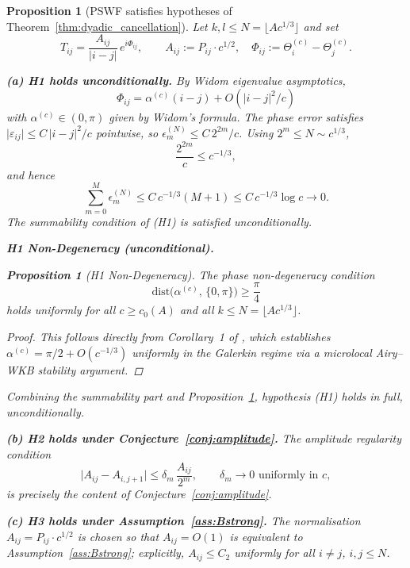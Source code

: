 \documentclass[12pt]{amsart}
\newtheorem{proposition}[theorem]{Proposition}
\theoremstyle{definition}
\theoremstyle{remark}
\newcommand{\abs}[1]{\lvert#1\rvert}
\begin{document}
\begin{proposition}[PSWF satisfies hypotheses of
  Theorem~\ref{thm:dyadic_cancellation}]
\label{prop:PSWF_hypotheses}
Let $k,l \leq N = \lfloor Ac^{1/3} \rfloor$ and set
\[
  T_{ij} = \frac{A_{ij}}{\abs{i-j}}\,e^{i\Phi_{ij}},
  \qquad
  A_{ij} := P_{ij} \cdot c^{1/2},
  \quad
  \Phi_{ij} := \Theta_i^{(c)} - \Theta_j^{(c)}.
\]

\medskip\noindent
\textbf{(a) H1 holds unconditionally.}
By Widom eigenvalue asymptotics,
\[
  \Phi_{ij} = \alpha^{(c)}(i-j) + O(\abs{i-j}^2/c)
\]
with $\alpha^{(c)} \in (0,\pi)$ given by Widom's formula.
The phase error satisfies $\abs{\varepsilon_{ij}}
\leq C\,\abs{i-j}^2/c$ pointwise, so
$\epsilon_m^{(N)} \leq C\,2^{2m}/c$.
Using $2^m \leq N \sim c^{1/3}$,
\[
  \frac{2^{2m}}{c} \leq c^{-1/3},
\]
and hence
\[
  \sum_{m=0}^{M} \epsilon_m^{(N)}
  \leq C\,c^{-1/3}(M+1)
  \leq C\,c^{-1/3}\log c \to 0.
\]
The summability condition of \textup{(H1)} is satisfied
unconditionally.

\medskip\noindent
\textbf{H1 Non-Degeneracy (unconditional).}

\begin{proposition}[H1 Non-Degeneracy]
\label{prop:H1_nondeg}
The phase non-degeneracy condition
\[
  \mathrm{dist}\bigl(\alpha^{(c)},\,\{0,\pi\}\bigr)
  \ge \frac{\pi}{4}
\]
holds uniformly for all $c \ge c_0(A)$
and all $k \le N = \lfloor Ac^{1/3}\rfloor$.
\end{proposition}

\begin{proof}
This follows directly from Corollary~1 of \cite{PhaseNondeg},
which establishes
$\alpha^{(c)} = \pi/2 + O(c^{-1/3})$
uniformly in the Galerkin regime via a microlocal
Airy--WKB stability argument.
\end{proof}

Combining the summability part and Proposition~\ref{prop:H1_nondeg},
hypothesis \textup{(H1)} holds in full, unconditionally.

\medskip\noindent
\textbf{(b) H2 holds under Conjecture~\ref{conj:amplitude}.}
The amplitude regularity condition
\[
  \abs{A_{ij}-A_{i,j+1}} \leq \delta_m\,\frac{A_{ij}}{2^m},
  \qquad \delta_m \to 0 \text{ uniformly in } c,
\]
is precisely the content of Conjecture~\ref{conj:amplitude}.

\medskip\noindent
\textbf{(c) H3 holds under Assumption~\ref{ass:Bstrong}.}
The normalisation $A_{ij} = P_{ij} \cdot c^{1/2}$ is chosen
so that $A_{ij} = O(1)$ is equivalent to
Assumption~\ref{ass:Bstrong}; explicitly,
$A_{ij} \leq C_2$ uniformly for all $i \neq j$,
$i,j\leq N$.
\end{proposition}
\end{document}
